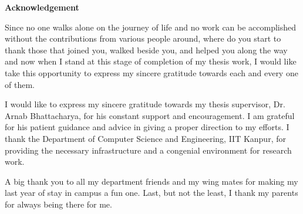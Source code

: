 \cleardoublepage

\begin{center}
	{\huge{\textbf{Acknowledgement}}}
\end{center}

Since no one walks alone on the journey of life and no work can be accomplished without the contributions from various people around, where do you start to thank those that joined you, walked beside you, and helped you along the way and now when I stand at this stage of completion of my thesis work, I would like take this opportunity to express my sincere gratitude towards each and every one of them.

I would like to express my sincere gratitude towards my thesis supervisor, Dr. Arnab Bhattacharya, for his  constant support and encouragement. I am grateful for his patient guidance and advice in giving a proper direction to my efforts. I thank the Department of Computer Science and Engineering, IIT Kanpur, for providing the necessary infrastructure and a congenial environment for research work.

A big thank you to all my department friends and my wing mates for making my last year of stay in campus a fun one. Last, but not the least, I thank my parents for always being there for me.

\vskip 4mm
\begin{flushright}
\textit{\textbf{\author}}
\end{flushright}